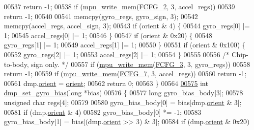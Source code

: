 \begin{DoxyCode}
00537         \textcolor{keywordflow}{return} -1;
00538     \textcolor{keywordflow}{if} (\hyperlink{group___d_r_i_v_e_r_s_gafea59910bc3dd30ba3356b1c75213a5f}{mpu\_write\_mem}(\hyperlink{group___d_r_i_v_e_r_s_gac0e79063d1a071c1a8bd3f7081e4299e}{FCFG\_2}, 3, accel\_regs))
00539         \textcolor{keywordflow}{return} -1;
00540 
00541     memcpy(gyro\_regs, gyro\_sign, 3);
00542     memcpy(accel\_regs, accel\_sign, 3);
00543     \textcolor{keywordflow}{if} (orient & 4) \{
00544         gyro\_regs[0] |= 1;
00545         accel\_regs[0] |= 1;
00546     \}
00547     \textcolor{keywordflow}{if} (orient & 0x20) \{
00548         gyro\_regs[1] |= 1;
00549         accel\_regs[1] |= 1;
00550     \}
00551     \textcolor{keywordflow}{if} (orient & 0x100) \{
00552         gyro\_regs[2] |= 1;
00553         accel\_regs[2] |= 1;
00554     \}
00555 
00556     \textcolor{comment}{/* Chip-to-body, sign only. */}
00557     \textcolor{keywordflow}{if} (\hyperlink{group___d_r_i_v_e_r_s_gafea59910bc3dd30ba3356b1c75213a5f}{mpu\_write\_mem}(\hyperlink{group___d_r_i_v_e_r_s_ga68df22b3699418acab9063ee5f996d8e}{FCFG\_3}, 3, gyro\_regs))
00558         \textcolor{keywordflow}{return} -1;
00559     \textcolor{keywordflow}{if} (\hyperlink{group___d_r_i_v_e_r_s_gafea59910bc3dd30ba3356b1c75213a5f}{mpu\_write\_mem}(\hyperlink{group___d_r_i_v_e_r_s_ga687777b4390e4a84ac774cf0600abe20}{FCFG\_7}, 3, accel\_regs))
00560         \textcolor{keywordflow}{return} -1;
00561     dmp.\hyperlink{structdmp__s_ac949b11ebfe17c3a2ac42785a1437c25}{orient} = \hyperlink{structdmp__s_ac949b11ebfe17c3a2ac42785a1437c25}{orient};
00562     \textcolor{keywordflow}{return} 0;
00563 \}
00564 
\hypertarget{inv__mpu__dmp__motion__driver_8c_source.tex_l00575}{}\hyperlink{group___d_r_i_v_e_r_s_ga4766e37ef95cbf0044c8f9594ed811d1}{00575} \textcolor{keywordtype}{int} \hyperlink{group___d_r_i_v_e_r_s_ga4766e37ef95cbf0044c8f9594ed811d1}{dmp\_set\_gyro\_bias}(\textcolor{keywordtype}{long} *bias)
00576 \{
00577     \textcolor{keywordtype}{long} gyro\_bias\_body[3];
00578     \textcolor{keywordtype}{unsigned} \textcolor{keywordtype}{char} regs[4];
00579 
00580     gyro\_bias\_body[0] = bias[dmp.\hyperlink{structdmp__s_ac949b11ebfe17c3a2ac42785a1437c25}{orient} & 3];
00581     \textcolor{keywordflow}{if} (dmp.\hyperlink{structdmp__s_ac949b11ebfe17c3a2ac42785a1437c25}{orient} & 4)
00582         gyro\_bias\_body[0] *= -1;
00583     gyro\_bias\_body[1] = bias[(dmp.\hyperlink{structdmp__s_ac949b11ebfe17c3a2ac42785a1437c25}{orient} >> 3) & 3];
00584     \textcolor{keywordflow}{if} (dmp.\hyperlink{structdmp__s_ac949b11ebfe17c3a2ac42785a1437c25}{orient} & 0x20)

\end{DoxyCode}

